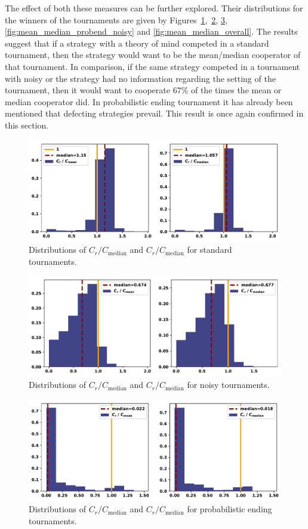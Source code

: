 \documentclass{article}
\begin{document}
The effect of both these measures can be further explored. Their distributions
for the winners of the tournaments are given by
Figures~\ref{fig:mean_median_std},~\ref{fig:mean_median_noisy},
\ref{fig:mean_median_probend}, \ref{fig:mean_median_probend_noisy} and
\ref{fig:mean_median_overall}. The results suggest that if a strategy with
a theory of mind competed in a standard tournament, then the strategy would
want to be the mean/median cooperator of that tournament. In comparison, if the
same strategy competed in a tournament with noisy or the strategy had no
information regarding the setting of the tournament, then it would
want to cooperate 67\% of the times the mean or median cooperator did.
In probabilistic ending tournament it has already been mentioned that defecting
strategies prevail. This result is once again confirmed in this section.

\begin{figure}[!htbp]
    \centering
    \includegraphics[width=.5\textwidth]{../images/compared_to_mean_median_standard.pdf}
    \caption{Distributions of \(C_r / C_{\text{median}}\)
    and \(C_r / C_{\text{median}}\) for standard tournaments.}\label{fig:mean_median_std}
\end{figure}

\begin{figure}[!htbp]
    \centering
    \includegraphics[width=.5\textwidth]{../images/compared_to_mean_median_noisy.pdf}
    \caption{Distributions of \(C_r / C_{\text{median}}\)
    and \(C_r / C_{\text{median}}\) for noisy tournaments.}\label{fig:mean_median_noisy}
\end{figure}

\begin{figure}[!htbp]
    \centering
    \includegraphics[width=.5\textwidth]{../images/compared_to_mean_median_probend.pdf}
    \caption{Distributions of \(C_r / C_{\text{median}}\)
    and \(C_r / C_{\text{median}}\) for probabilistic ending tournaments.}\label{fig:mean_median_probend}
\end{figure}
\end{document}
